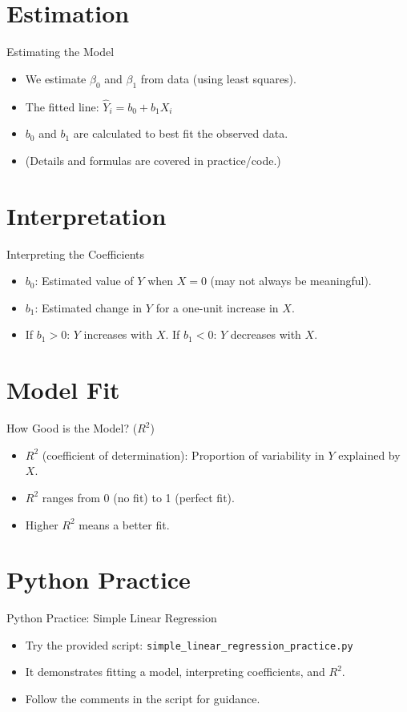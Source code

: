 \documentclass[aspectratio=169]{beamer}
\begin{document}
\section{Estimation}
\begin{frame}{Estimating the Model}
  \begin{itemize}
    \item We estimate $\beta_0$ and $\beta_1$ from data (using least squares).
    \item The fitted line: $\hat{Y}_i = b_0 + b_1 X_i$
    \item $b_0$ and $b_1$ are calculated to best fit the observed data.
    \item (Details and formulas are covered in practice/code.)
  \end{itemize}
\end{frame}

\section{Interpretation}
\begin{frame}{Interpreting the Coefficients}
  \begin{itemize}
    \item $b_0$: Estimated value of $Y$ when $X=0$ (may not always be meaningful).
    \item $b_1$: Estimated change in $Y$ for a one-unit increase in $X$.
    \item If $b_1 > 0$: $Y$ increases with $X$. If $b_1 < 0$: $Y$ decreases with $X$.
  \end{itemize}
\end{frame}

\section{Model Fit}
\begin{frame}{How Good is the Model? ($R^2$)}
  \begin{itemize}
    \item $R^2$ (coefficient of determination): Proportion of variability in $Y$ explained by $X$.
    \item $R^2$ ranges from 0 (no fit) to 1 (perfect fit).
    \item Higher $R^2$ means a better fit.
  \end{itemize}
\end{frame}

\section{Python Practice}
\begin{frame}{Python Practice: Simple Linear Regression}
  \begin{itemize}
    \item Try the provided script: \texttt{simple\_linear\_regression\_practice.py}
    \item It demonstrates fitting a model, interpreting coefficients, and $R^2$.
    \item Follow the comments in the script for guidance.
  \end{itemize}
\end{frame}
\end{document}
